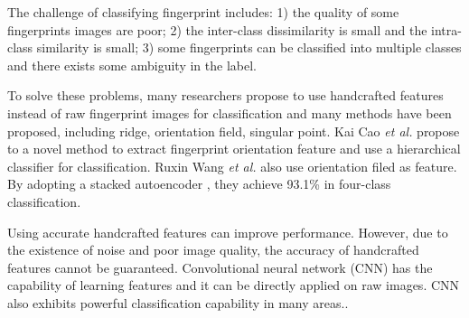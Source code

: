 
The challenge of classifying fingerprint includes: 
%
1) the quality of some fingerprints images are poor; 
%
2) the inter-class dissimilarity is small and the intra-class similarity is small; 
%
3) some fingerprints can be classified into multiple classes and there exists some ambiguity in the label.

To solve these problems, many researchers propose to use handcrafted features instead of raw fingerprint images for classification and many methods have been proposed, including ridge, orientation field, singular point.
%
Kai Cao \textit{et al.}\cite{cao2013fingerprint} propose to a novel method to extract fingerprint orientation feature and use a hierarchical classifier for classification.
%
Ruxin Wang \textit{et al.} \cite{wang2014fingerprint} also use orientation filed as feature. By adopting a stacked autoencoder , they achieve 93.1\% in four-class classification.
%

Using accurate handcrafted features can improve performance.  However, due to the existence of noise and poor image quality, the accuracy of handcrafted features cannot be guaranteed.
%
Convolutional neural network (CNN) has the capability of learning features and it can be directly applied on raw images. CNN also exhibits powerful classification capability in many areas.\cite{szegedy2016rethinking}.


